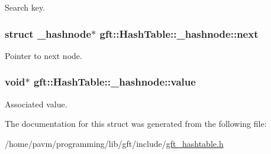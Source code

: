 Search key. 

\hypertarget{structgft_1_1HashTable_1_1__hashnode_ab30373c898ea03781984ea757fa439f5}{
\subsubsection[{next}]{\setlength{\rightskip}{0pt plus 5cm}struct {\bf \-\_\-hashnode}$\ast$ gft\-::\-Hash\-Table\-::\-\_\-hashnode\-::next}}\label{structgft_1_1HashTable_1_1__hashnode_ab30373c898ea03781984ea757fa439f5}


Pointer to next node. 

\hypertarget{structgft_1_1HashTable_1_1__hashnode_a2e02f3fdfd0d509ca0ec8dbdd57e19de}{
\subsubsection[{value}]{\setlength{\rightskip}{0pt plus 5cm}void$\ast$ gft\-::\-Hash\-Table\-::\-\_\-hashnode\-::value}}\label{structgft_1_1HashTable_1_1__hashnode_a2e02f3fdfd0d509ca0ec8dbdd57e19de}


Associated value. 



The documentation for this struct was generated from the following file\-:\begin{DoxyCompactItemize}
\item 
/home/pavm/programming/lib/gft/include/\hyperlink{gft__hashtable_8h}{gft\-\_\-hashtable.\-h}\end{DoxyCompactItemize}
